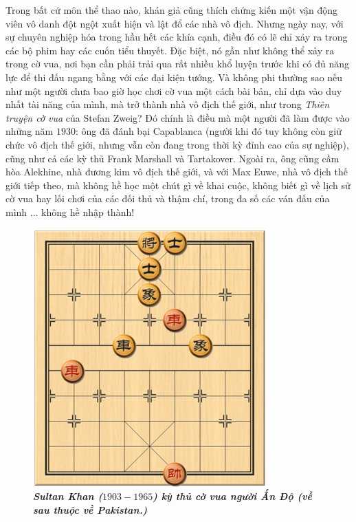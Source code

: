 \vspace*{190pt}
\begin{multicols}{2}
	Trong bất cứ môn thể thao nào, khán giả cũng thích chứng kiến một vận động viên vô danh đột ngột xuất hiện và lật đổ các nhà vô địch. Nhưng ngày nay, với sự chuyên nghiệp hóa trong hầu hết các khía cạnh, điều đó có lẽ chỉ xảy ra trong các bộ phim hay các cuốn tiểu thuyết. Đặc biệt, nó gần như không thể xảy ra trong cờ vua, nơi bạn cần phải trải qua rất nhiều khổ luyện trước khi có đủ năng lực để thi đấu ngang bằng với các đại kiện tướng. Và không phi thường sao nếu như một người chưa bao giờ học chơi cờ vua một cách bài bản, chỉ dựa vào duy nhất tài năng của mình, mà trở thành nhà vô địch thế giới, như trong \textit{Thiên truyện cờ vua} của Stefan Zweig?
	\vskip 0.05cm
	Đó chính là điều mà một người đã làm được vào những năm $1930$: ông đã đánh bại Capablanca (người khi đó tuy không còn giữ chức vô địch thế giới, nhưng vẫn còn đang trong thời kỳ đỉnh cao của sự nghiệp), cũng như cả các kỳ thủ Frank Marshall và Tartakover. Ngoài ra, ông cũng cầm hòa Alekhine, nhà đương kim vô địch thế giới, và với Max Euwe, nhà vô địch thế giới tiếp theo, mà không hề học một chút gì về khai cuộc, không biết gì về lịch sử cờ vua hay lối chơi của các đối thủ và thậm chí, trong đa số các ván đấu của mình ... không hề nhập thành!
	\begin{figure}[H]
		\vspace*{-5pt}
		\centering
		\captionsetup{labelformat= empty, justification=centering}
		\includegraphics[width= 0.7\linewidth]{1}
		\caption{\small\textit\textbf{\color{gocco}Sultan Khan ($1903-1965$) kỳ thủ cờ vua người Ấn Độ (về sau thuộc về Pakistan.)}}

\end{figure}
\end{multicols}
